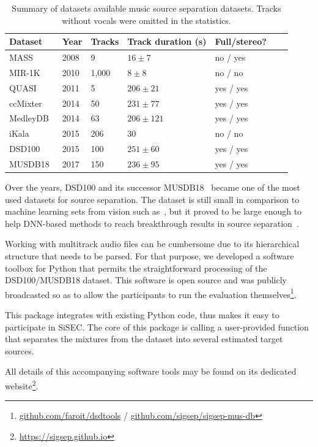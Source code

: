 \begin{table}[htbp]
	\centering
  \begin{tabular}{l l l l l l l}
    \toprule
    \textbf{Dataset} & \textbf{Year} & \textbf{Tracks} & \textbf{Track duration (s)} & \textbf{Full/stereo?}\\
    \midrule
    MASS~\cite{MTGMASSdb} & 2008 & 9 & $16 \pm 7$ & no / yes \\
    MIR-1K~\cite{hsu10} & 2010 & 1,000 & $8 \pm 8$ & no / no \\
    QUASI~\cite{liutkus11,vincent12} & 2011 & 5 & $206 \pm 21$ & yes / yes \\
    ccMixter~\cite{liutkus142} & 2014 & 50 & $231 \pm 77 $ & yes / yes \\
    MedleyDB~\cite{bittner14} & 2014 & 63 & $206 \pm 121$ & yes / yes \\
    iKala~\cite{chan15} & 2015 & 206 & 30 & no / no \\
    DSD100~\cite{liutkus17} & 2015 & 100 & $251 \pm 60$ & yes / yes \\
    MUSDB18~\cite{stoeter18sisec} & 2017 & 150 & $236 \pm 95$ & yes / yes \\
    \bottomrule
  \end{tabular}
  \caption{Summary of datasets available music source separation datasets. Tracks without vocals were omitted in the statistics.}
	\label{tab:datasets}
\end{table}

Over the years, DSD100 and its successor MUSDB18~\cite{oss_musdb} became one of the most used datasets for source separation.
The dataset is still small in comparison to machine learning sets from vision such as~\cite{imagenet09}, but it proved to be large enough to help DNN-based methods to reach breakthrough results in source separation~\cite{stoeter18sisec}.
\par
Working with multitrack audio files can be cumbersome due to its hierarchical structure that needs to be parsed.
For that purpose, we developed a software toolbox for Python that permits the straightforward processing of the DSD100/MUSDB18 dataset. This software is open source and was publicly broadcasted so as to allow the participants to run the evaluation themselves\footnote{\url{github.com/faroit/dsdtools} / \url{github.com/sigsep/sigsep-mus-db}}.
\par
This package integrates with existing Python code, thus makes it easy to participate in \acs{SiSEC}. The core of this package is calling a user-provided function that separates the mixtures from the dataset into several estimated target sources.

All details of this accompanying software tools may be found on its dedicated website\footnote{\url{https://sigsep.github.io}}.